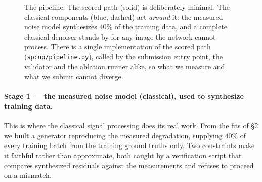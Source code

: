 \begin{figure}[t]
\centering
{}
\caption{The pipeline. The scored path (solid) is deliberately minimal. The classical
components (blue, dashed) act \emph{around} it: the measured noise model synthesizes
40\% of the training data, and a complete classical denoiser stands by for any image the
network cannot process. There is a single implementation of the scored path
(\texttt{spcup/pipeline.py}), called by the submission entry point, the validator and the
ablation runner alike, so what we measure and what we submit cannot diverge.}
\label{fig:pipe}
\end{figure}

\paragraph{Stage 1 --- the measured noise model (classical), used to synthesize training data.}
This is where the classical signal processing does its real work. From the fits of \S2 we
built a generator reproducing the measured degradation, supplying $40\%$ of every
training batch from the training ground truths only. Two constraints make it faithful
rather than approximate, both caught by a verification script that compares synthesized
residuals against the measurements and refuses to proceed on a mismatch.

